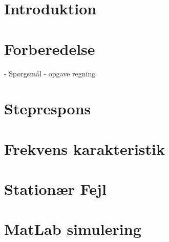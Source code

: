 \documentclass[a4paper,oneside,article]{memoir}
\begin{document}

\renewcommand\contentsname{Indholdsfortegnelse}
\tableofcontents*
\newpage
\chapter{Introduktion} 





\chapter{Forberedelse}
- Spørgsmål
- opgave regning

\chapter{Steprespons}

\chapter{Frekvens karakteristik}

\chapter{Stationær Fejl}


\chapter{MatLab simulering}
\end{document}
